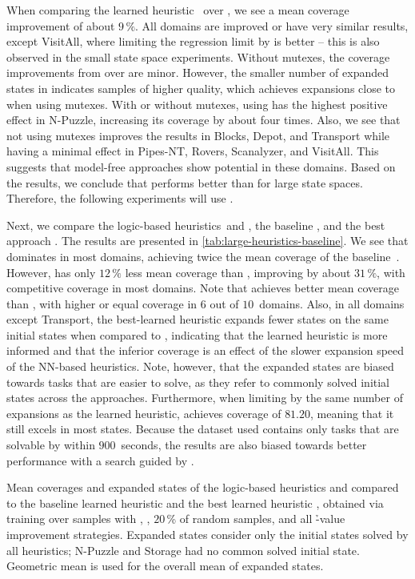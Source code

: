 When comparing the learned heuristic~\hnnl{\rlmeanfx} over \hnnl{\rlfacts}, we see a mean coverage improvement of about $9\,\%$. All domains are improved or have very similar results, except VisitAll, where limiting the regression limit by \rlfacts is better -- this is also observed in the small state space experiments. Without mutexes, the coverage improvements from \rlmeanfx over \rlfacts are minor. However, the smaller number of expanded states in \hnnnomutexl{\rlmeanfx} indicates samples of higher quality, which achieves expansions close to when using mutexes. With or without mutexes, using \rlmeanfx has the highest positive effect in N-Puzzle, increasing its coverage by about four times. Also, we see that not using mutexes improves the results in Blocks, Depot, and Transport while having a minimal effect in Pipes-NT, Rovers, Scanalyzer, and VisitAll. This suggests that model-free approaches show potential in these domains. Based on the results, we conclude that \rlmeanfx performs better than \rlfacts for large state spaces. Therefore, the following experiments will use \rlmeanfx.

Next, we compare the logic-based heuristics~\hff and \hgc, the baseline \hnnbase, and the best approach \hnnrs. The results are presented in \cref{tab:large-heuristics-baseline}. We see that \hff dominates in most domains, achieving twice the mean coverage of the baseline~\hnnbase. However, \hnnrs has only $12\,\%$ less mean coverage than \hff, improving \hnnbase by about $31\,\%$, with competitive coverage in most domains. Note that \hnnrs achieves better mean coverage than \hgc, with higher or equal coverage in $6$ out of $10$~domains. Also, in all domains except Transport, the best-learned heuristic expands fewer states on the same initial states when compared to \hff, indicating that the learned heuristic is more informed and that the inferior coverage is an effect of the slower expansion speed of the NN-based heuristics. Note, however, that the expanded states are biased towards tasks that are easier to solve, as they refer to commonly solved initial states across the approaches. Furthermore, when limiting \hff by the same number of expansions as the learned heuristic, \hff achieves coverage of $81.20$, meaning that it still excels in most states. Because the dataset used contains only tasks that are solvable by \hff within $900$~seconds, the results are also biased towards better performance with a search guided by \hff. 

\begin{table}[tb]
    \caption[Results of the logic-based, baseline, and the best learned heuristics.]{Mean coverages and expanded states of the logic-based heuristics \hff and \hgc compared to the baseline learned heuristic \hnnbase and the best learned heuristic \hnnrs, obtained via training over samples with \bfsrw, \rlmeanfx, $20$\,\% of random samples, and all \h-value improvement strategies. Expanded states consider only the initial states solved by all heuristics; N-Puzzle and Storage had no common solved initial state. Geometric mean is used for the overall mean of expanded states.}
    \label{tab:large-heuristics-baseline}
    \addmargin
    \centering
    
\end{table}

